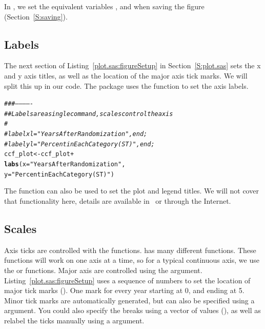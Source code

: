 \documentclass[nojss]{jss}\usepackage[]{graphicx}\usepackage[]{color}
\makeatletter
\newcommand{\hlstr}[1]{\textcolor[rgb]{0.192,0.494,0.8}{#1}}%
\newcommand{\hlcom}[1]{\textcolor[rgb]{0.678,0.584,0.686}{\textit{#1}}}%
\newcommand{\hlopt}[1]{\textcolor[rgb]{0,0,0}{#1}}%
\newcommand{\hlstd}[1]{\textcolor[rgb]{0.345,0.345,0.345}{#1}}%
\newcommand{\hlkwb}[1]{\textcolor[rgb]{0.69,0.353,0.396}{#1}}%
\newcommand{\hlkwc}[1]{\textcolor[rgb]{0.333,0.667,0.333}{#1}}%
\newcommand{\hlkwd}[1]{\textcolor[rgb]{0.737,0.353,0.396}{\textbf{#1}}}%
\newenvironment{kframe}{%
 \def\at@end@of@kframe{}%
 \ifinner\ifhmode%
  \def\at@end@of@kframe{\end{minipage}}%
  \begin{minipage}{\columnwidth}%
 \fi\fi%
 \def\FrameCommand##1{\hskip\@totalleftmargin \hskip-\fboxsep
 \colorbox{shadecolor}{##1}\hskip-\fboxsep
     \hskip-\linewidth \hskip-\@totalleftmargin \hskip\columnwidth}%
 \MakeFramed {\advance\hsize-\width
   \@totalleftmargin\z@ \linewidth\hsize
   \@setminipage}}%
 {\par\unskip\endMakeFramed%
 \at@end@of@kframe}
\newenvironment{knitrout}{}{} %
\makeatother
\begin{document}
In , we set the equivalent variables ,  and  when saving the figure (Section~\ref{S:saving}).

\subsection{Labels}\label{S:labels}
The next section of Listing~\ref{plot.sas:figureSetup} in Section~\ref{S:plot.sas} sets the x and y axis titles, as well as the location of the major axis tick marks. We will split this up in our  code. The  package uses the  function to set the axis labels. 
\begin{knitrout}\footnotesize
{}\color{fgcolor}\begin{kframe}
\begin{alltt}
\hlcom{###-------------}
\hlcom{## Labels are a single command, scales control the axis}
\hlcom{#}
\hlcom{#    labelx l="Years After Randomization", end;}
\hlcom{#    labely l="Percent in Each Category (ST)", end;}
\hlstd{ccf_plot} \hlkwb{<-} \hlstd{ccf_plot} \hlopt{+}
  \hlkwd{labs}\hlstd{(}\hlkwc{x}\hlstd{=}\hlstr{"Years After Randomization"}\hlstd{,}
       \hlkwc{y}\hlstd{=}\hlstr{"Percent in Each Category (ST)"}\hlstd{)}
\end{alltt}
\end{kframe}
\end{knitrout}

The  function can also be used to set the plot  and legend titles. We will not cover that functionality here, details are available in~\cite{Wickham:2009} or through the Internet.

\subsection{Scales}\label{S:scales}
Axis ticks are controlled with the  functions.  has many different  functions. These functions will work on one axis at a time, so for a typical continuous axis, we use the  or  functions. Major axis are controlled using the  argument. Listing~\ref{plot.sas:figureSetup} uses a sequence of numbers to set the location of major tick marks (). One mark for every year starting at 0, and ending at 5. Minor tick marks are automatically generated, but can also be specified using a  argument. You could also specify the breaks using a vector of values (), as well as relabel the ticks manually using a  argument.
\end{document}
